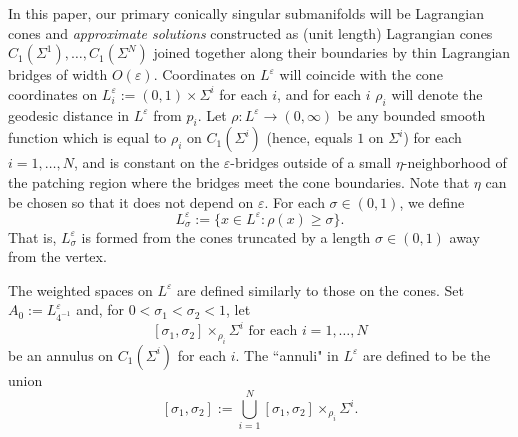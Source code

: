 \documentclass[11pt]{amsart}
\theoremstyle{definition}
\theoremstyle{remark}
\begin{document}
In this paper, our primary conically singular submanifolds will be Lagrangian cones and \emph{approximate solutions} constructed as (unit length) Lagrangian cones $C_1(\Sigma^1),\ldots, C_1(\Sigma^N)$ joined together along their boundaries by thin Lagrangian bridges of width $O(\varepsilon)$. Coordinates on $L^\varepsilon$ will coincide with the cone coordinates on $L_i^\varepsilon := (0,1) \times \Sigma^i$ for each $i$, and for each $i$ $\rho_i$ will denote the geodesic distance in $L^\varepsilon$ from $p_i$. Let $\rho :L^\varepsilon \rightarrow (0,\infty)$ be any bounded smooth function which is equal to $\rho_i$ on $C_1(\Sigma^i)$ (hence, equals $1$ on $\Sigma^i$) for each $i = 1,\ldots, N$, and is constant on the $\varepsilon$-bridges outside of a small $\eta$-neighborhood of the patching region where the bridges meet the cone boundaries. Note that $\eta$ can be chosen so that it does not depend on $\varepsilon$. For each $\sigma \in (0,1)$, we define
\[L_\sigma^\varepsilon := \{ x \in L^\varepsilon : \rho(x) \geq \sigma\}.\]
That is, $L_\sigma^\varepsilon$ is formed from the cones truncated by a length $\sigma \in (0,1)$ away from the vertex. 

The weighted spaces on $L^\varepsilon$ are defined similarly to those on the cones. Set $A_0 := L_{4^{-1}}^\varepsilon$ and, for $0 < \sigma_1 < \sigma_2 < 1$, let 
\[[\sigma_1,\sigma_2] \times_{\rho_i} \Sigma^i \text { for each } i = 1,\ldots, N\]
be an annulus on $C_1(\Sigma^i)$ for each $i$. The ``annuli" in $L^\varepsilon$ are defined to be the union
\[[\sigma_1,\sigma_2] := \bigcup_{i = 1}^N [\sigma_1,\sigma_2] \times_{\rho_i} \Sigma^i.\]
\end{document}
